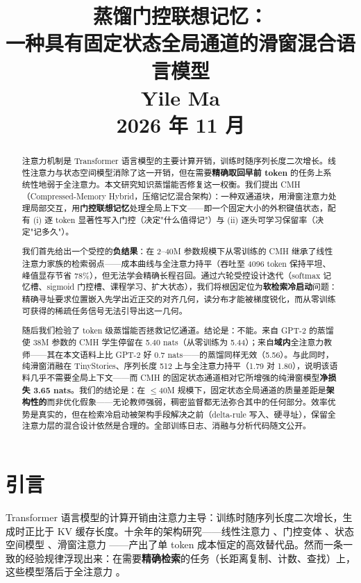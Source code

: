\documentclass[11pt]{ctexart}
\title{\textbf{蒸馏门控联想记忆：\\一种具有固定状态全局通道的滑窗混合语言模型}\\[0.6em]
\large Yile Ma\\[0.2em]
\normalsize 2026 年 11 月}
\date{}
\newcommand{\cmh}{CMH}
\begin{document}
\maketitle

\begin{abstract}
注意力机制是 Transformer 语言模型的主要计算开销，训练时随序列长度二次增长。线性注意力与状态空间模型消除了这一开销，但在需要\textbf{精确取回早前 token} 的任务上系统性地弱于全注意力。本文研究知识蒸馏能否修复这一权衡。我们提出 \cmh{}（Compressed-Memory Hybrid，压缩记忆混合架构）：一种双通道块，用滑窗注意力处理局部交互，用\textbf{门控联想记忆}处理全局上下文——即一个固定大小的外积键值状态，配有 (i) 逐 token 显著性写入门控（决定"什么值得记"）与 (ii) 逐头可学习保留率（决定"记多久"）。

我们首先给出一个受控的\textbf{负结果}：在 2--40M 参数规模下从零训练的 \cmh{} 继承了线性注意力家族的检索弱点——成本曲线与全注意力持平（吞吐至 4096 token 保持平坦、峰值显存节省 78\%），但无法学会精确长程召回。通过六轮受控设计迭代（softmax 记忆槽、sigmoid 门控槽、课程学习、扩大状态），我们将根因定位为\textbf{软检索冷启动}问题：精确寻址要求位置嵌入先学出近正交的对齐几何，读分布才能被梯度锐化，而从零训练可获得的稀疏任务信号无法引导出这一几何。

随后我们检验了 token 级蒸馏能否拯救记忆通道。结论是：不能。来自 GPT-2 的蒸馏使 38M 参数的 \cmh{} 学生停留在 5.40 nats（从零训练为 5.44）；来自\textbf{域内}全注意力教师——其在本文语料上比 GPT-2 好 0.7 nats——的蒸馏同样无效（5.56）。与此同时，纯滑窗消融在 TinyStories、序列长度 512 上与全注意力持平（1.79 对 1.80），说明该语料几乎不需要全局上下文——而 \cmh{} 的固定状态通道相对它所增强的纯滑窗模型\textbf{净损失 3.65 nats}。我们的结论是：在 $\le$40M 规模下，固定状态全局通道的质量差距是\textbf{架构性的}而非优化假象——无论教师强弱，稠密监督都无法弥合其中的任何部分。效率优势是真实的，但在检索冷启动被架构手段解决之前（delta-rule 写入、硬寻址），保留全注意力层的混合设计依然是合理的。全部训练日志、消融与分析代码随文公开。
\end{abstract}

\section{引言}\label{sec:intro}

Transformer 语言模型的计算开销由注意力主导：训练时随序列长度二次增长，生成时正比于 KV 缓存长度。十余年的架构研究——线性注意力 \cite{katharopoulos2020}、门控变体 \cite{yang2023gla,peng2023rwkv}、状态空间模型 \cite{gu2023mamba}、滑窗注意力 \cite{beltagy2020longformer}——产出了单 token 成本恒定的高效替代品。然而一条一致的经验规律浮现出来：在需要\textbf{精确检索}的任务（长距离复制、计数、查找）上，这些模型落后于全注意力 \cite{waleffe2024jamba}。
\end{document}
